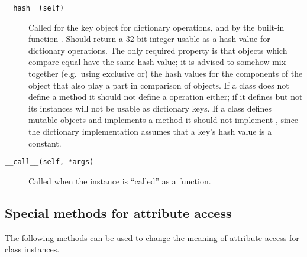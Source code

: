 \begin{description}
\item[{\tt __hash__(self)}]
Called for the key object for dictionary operations,
and by the built-in function
.  Should return a 32-bit integer
usable as a hash value
for dictionary operations.  The only required property is that objects
which compare equal have the same hash value; it is advised to somehow
mix together (e.g.\ using exclusive or) the hash values for the
components of the object that also play a part in comparison of
objects.  If a class does not define a  method it should
not define a  operation either; if it defines
 but not  its instances will not be
usable as dictionary keys.  If a class defines mutable objects and
implements a  method it should not implement
, since the dictionary implementation assumes that a
key's hash value is a constant.

\item[{\tt __call__(self, *args)}]
Called when the instance is ``called'' as a function.

\end{description}


\subsection{Special methods for attribute access}

The following methods can be used to change the meaning of attribute
access for class instances.

